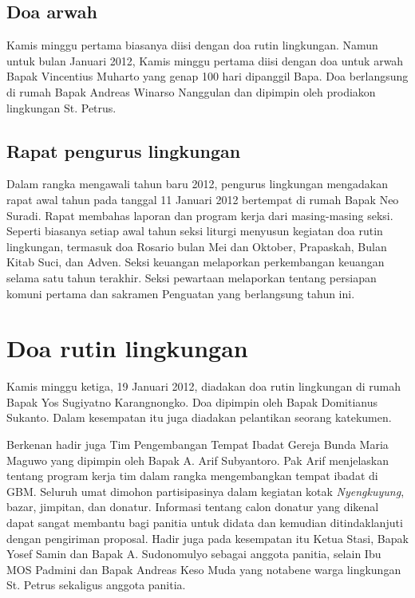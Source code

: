 
\subsection*{Doa arwah}
Kamis minggu pertama biasanya diisi dengan doa rutin lingkungan. Namun untuk bulan Januari 2012, Kamis minggu pertama diisi dengan doa untuk arwah Bapak Vincentius Muharto yang genap 100 hari dipanggil Bapa. Doa berlangsung di rumah Bapak Andreas Winarso Nanggulan dan dipimpin oleh prodiakon lingkungan St. Petrus. 

\subsection*{Rapat pengurus lingkungan}
Dalam rangka mengawali tahun baru 2012, pengurus lingkungan mengadakan rapat awal tahun pada tanggal 11 Januari 2012 bertempat di rumah Bapak Neo Suradi. Rapat membahas laporan dan program kerja dari masing-masing seksi. Seperti biasanya setiap awal tahun seksi liturgi menyusun kegiatan doa rutin lingkungan, termasuk doa Rosario bulan Mei dan Oktober, Prapaskah, Bulan Kitab Suci, dan Adven. Seksi keuangan melaporkan perkembangan keuangan selama  satu tahun terakhir. Seksi pewartaan melaporkan tentang persiapan komuni pertama dan sakramen Penguatan yang berlangsung tahun ini.

\section*{Doa rutin lingkungan}
Kamis minggu ketiga, 19 Januari 2012, diadakan doa rutin lingkungan di rumah Bapak Yos Sugiyatno Karangnongko. Doa dipimpin oleh Bapak Domitianus Sukanto. Dalam kesempatan itu juga diadakan pelantikan seorang katekumen.

Berkenan hadir juga Tim Pengembangan Tempat Ibadat Gereja Bunda Maria Maguwo yang dipimpin oleh Bapak A. Arif Subyantoro. Pak Arif menjelaskan tentang program kerja tim dalam rangka mengembangkan tempat ibadat di GBM. Seluruh umat dimohon partisipasinya dalam kegiatan kotak \textit{Nyengkuyung}, bazar, jimpitan, dan donatur. Informasi tentang calon donatur yang dikenal dapat sangat membantu bagi panitia untuk didata dan kemudian ditindaklanjuti dengan pengiriman proposal. Hadir juga pada kesempatan itu Ketua Stasi, Bapak Yosef Samin dan Bapak A. Sudonomulyo sebagai anggota panitia, selain Ibu MOS Padmini dan Bapak Andreas Keso Muda yang notabene warga lingkungan St. Petrus sekaligus anggota panitia.
 
 